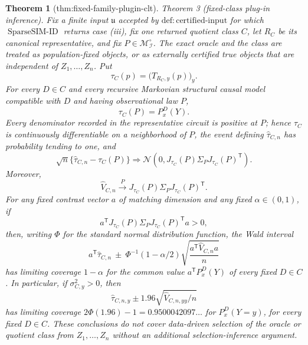 \documentclass{article}
\newtheorem{theorem}{Theorem}
\begin{document}
\begin{theorem}[thm:fixed-family-plugin-clt]\label{thm:fixed-family-plugin-clt}
Theorem 3 (fixed-class plug-in inference).  Fix a finite input \(\mathfrak u\) accepted by \(\mathrm{def{:}certified\text{-}input}\) for which \(\operatorname{SparseSIM\text{-}ID}\) returns case (iii), fix one returned quotient class \(C\), let \(R_C\) be its canonical representative, and fix \(P\in\mathcal M_{\mathcal I}^{\circ}\).  The exact oracle and the class are treated as population-fixed objects, or as externally certified true objects that are independent of \(Z_1,\ldots,Z_n\).  Put
\[
 \tau_C(p)=\bigl(T_{R_C,y}(p)\bigr)_y.
\]
For every \(D\in C\) and every recursive Markovian structural causal model compatible with \(D\) and having observational law \(P\),
\[
 \tau_C(P)=P_x^D(Y).
\]
Every denominator recorded in the representative circuit is positive at \(P\); hence \(\tau_C\) is continuously differentiable on a neighborhood of \(P\), the event defining \(\widehat\tau_{C,n}\) has probability tending to one, and
\[
 \sqrt n\{\widehat\tau_{C,n}-\tau_C(P)\}
 \Rightarrow
 \mathcal N\!\left(0,
 J_{\tau_C}(P)\Sigma_PJ_{\tau_C}(P)^{\mathsf T}\right).
\]
Moreover,
\[
 \widehat V_{C,n}\xrightarrow{P}
 J_{\tau_C}(P)\Sigma_PJ_{\tau_C}(P)^{\mathsf T}.
\]
For any fixed contrast vector \(a\) of matching dimension and any fixed \(\alpha\in(0,1)\), if
\[
 a^{\mathsf T}J_{\tau_C}(P)\Sigma_PJ_{\tau_C}(P)^{\mathsf T}a>0,
\]
then, writing \(\Phi\) for the standard normal distribution function, the Wald interval
\[
 a^{\mathsf T}\widehat\tau_{C,n}
 \ \pm\
 \Phi^{-1}(1-\alpha/2)
 \sqrt{\frac{a^{\mathsf T}\widehat V_{C,n}a}{n}}
\]
has limiting coverage \(1-\alpha\) for the common value \(a^{\mathsf T}P_x^D(Y)\) of every fixed \(D\in C\).  In particular, if \(\sigma_{C,y}^2>0\), then
\[
 \widehat\tau_{C,n,y}\pm1.96\sqrt{\widehat V_{C,n,yy}/n}
\]
has limiting coverage \(2\Phi(1.96)-1=0.9500042097\ldots\) for \(P_x^D(Y=y)\), for every fixed \(D\in C\).  These conclusions do not cover data-driven selection of the oracle or quotient class from \(Z_1,\ldots,Z_n\) without an additional selection-inference argument.
\end{theorem}
\end{document}
